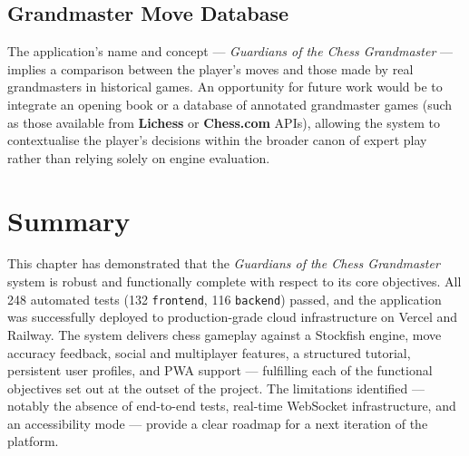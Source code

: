 \subsection*{Grandmaster Move Database}

The application's name and concept — \textit{Guardians of the Chess Grandmaster} — implies a comparison between the player's moves and those made by real grandmasters in historical games. An opportunity for future work would be to integrate an opening book or a database of annotated grandmaster games (such as those available from \textbf{Lichess} or \textbf{Chess.com} APIs), allowing the system to contextualise the player's decisions within the broader canon of expert play rather than relying solely on engine evaluation.


\section*{Summary}
\label{sec:eval-summary}

This chapter has demonstrated that the \textit{Guardians of the Chess Grandmaster} system is robust and functionally complete with respect to its core objectives. All 248 automated tests (132 \texttt{frontend}, 116 \texttt{backend}) passed, and the application was successfully deployed to production-grade cloud infrastructure on Vercel and Railway. The system delivers chess gameplay against a Stockfish engine, move accuracy feedback, social and multiplayer features, a structured tutorial, persistent user profiles, and PWA support — fulfilling each of the functional objectives set out at the outset of the project. The limitations identified — notably the absence of end-to-end tests, real-time WebSocket infrastructure, and an accessibility mode — provide a clear roadmap for a next iteration of the platform.